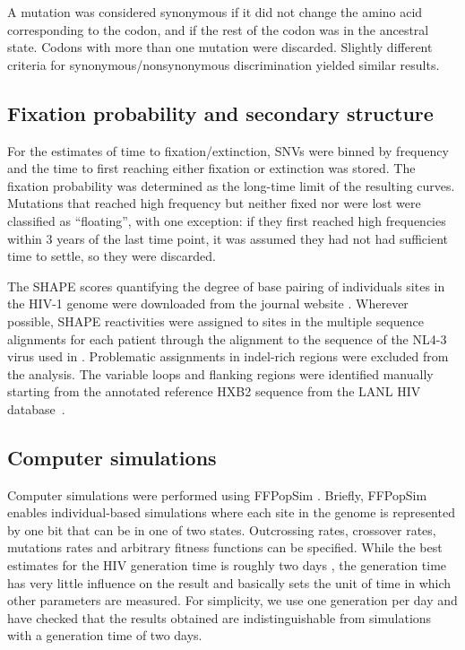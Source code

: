 \documentclass[11pt]{article}
\begin{document}
A mutation was considered synonymous if it did not change the amino acid
corresponding to the codon, and if the rest of the codon was in the ancestral
state. Codons with more than one mutation were discarded. Slightly different
criteria for synonymous/nonsynonymous discrimination yielded similar results.

\subsection*{Fixation probability and secondary structure}
For the estimates of time to fixation/extinction, SNVs were binned by
frequency and the time to first reaching either fixation or extinction was
stored. The fixation probability was determined as the long-time limit of the
resulting curves. Mutations that reached high frequency but neither fixed nor
were lost were classified as ``floating'', with one exception: if they first
reached high frequencies within 3 years of the last time point, it was assumed
they had not had sufficient time to settle, so they were discarded.

The SHAPE scores quantifying the degree of base pairing of individuals sites in
the HIV-1 genome were downloaded from the journal website
\citep{watts_architecture_2009}. Wherever possible, SHAPE reactivities were
assigned to sites in the multiple sequence alignments for each patient through
the alignment to the sequence of the NL4-3 virus used in
\citep{watts_architecture_2009}. Problematic assignments in indel-rich
regions were excluded from the analysis. The variable loops and flanking
regions were identified manually starting from the annotated reference HXB2
sequence from the LANL HIV database~\citep{LANL2012}. 

\subsection*{Computer simulations}
Computer simulations were performed using FFPopSim
\citep{zanini_ffpopsim:_2012}. Briefly, FFPopSim enables individual-based
simulations where each site in the genome is represented by one bit that can be
in one of two states. Outcrossing rates, crossover rates, mutations rates and
arbitrary fitness functions can be specified. While the best estimates
for the HIV generation time is roughly two days
\citep{perelson_hiv-1_1996, markowitz_novel_2003}, the generation time
has very little influence on the result and basically sets the unit of
time in which other parameters are measured. For simplicity, we use one
generation per day and have checked that the results obtained are
indistinguishable from simulations with a generation time of two days.
\end{document}
